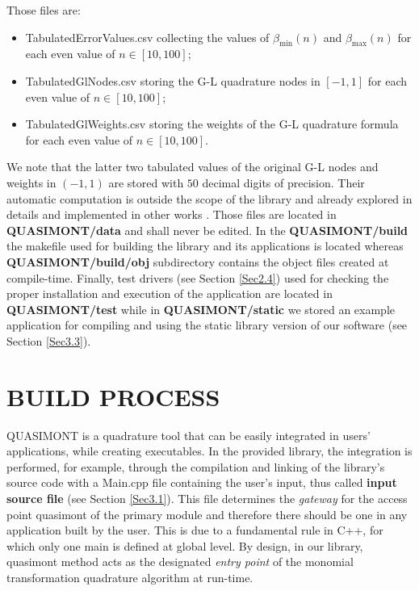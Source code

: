 \documentclass[a4paper, twosided]{book}
\begin{document}
\noindent 
 Those files are:
\begin{itemize}
    \item \colorbox{poliGrayBlue}{TabulatedErrorValues.csv} collecting the values of $\beta_{\text{min}}(n)$ and $\beta_{\text{max}}(n)$ for each even value of $n\in[10,100]$;
    \item \colorbox{poliGrayBlue}{TabulatedGlNodes.csv} storing the G-L quadrature nodes in $[-1,1]$ for each even value of $n\in[10,100]$;
    \item \colorbox{poliGrayBlue}{TabulatedGlWeights.csv} storing the weights of the G-L quadrature formula for each even value of $n\in[10,100]$.
\end{itemize}
We note that the latter two tabulated values of the original G-L nodes and weights in $(-1,1)$ are stored with $50$ decimal digits of precision. Their automatic computation is outside the scope of the library and already explored in details and implemented in other works \cite{Gautschi94,Hale13}. Those files are located in \colorbox{poliGrayBlue}{\textbf{QUASIMONT/data}} and shall never be edited. In the \colorbox{poliGrayBlue}{\textbf{QUASIMONT/build}} the \colorbox{poliGrayBlue}{makefile} used for building the library and its applications is located whereas \colorbox{poliGrayBlue}{\textbf{QUASIMONT/build/obj}} subdirectory contains the object files created at compile-time. Finally, test drivers (see Section \ref{Sec2.4}) used for checking the proper installation and execution of the application are located in \colorbox{poliGrayBlue}{\textbf{QUASIMONT/test}} while in \colorbox{poliGrayBlue}{\textbf{QUASIMONT/static}} we stored an example application for compiling and using the static library version of our software (see Section \ref{Sec3.3}).

\newpage
\section[Build process]{\changefont BUILD PROCESS}\label{Sec2.3}

\noindent
QUASIMONT is a quadrature tool that can be easily integrated in  users' applications, while creating executables. In the provided library, the integration is performed, for example, through the compilation and linking of the library's source code with a \colorbox{poliGrayBlue}{Main.cpp} file containing the user's input, thus called \color{poliDarkBlue} \textbf{input source file} \color{black} (see Section \ref{Sec3.1}). This file determines the {\itshape gateway} for the access point \colorbox{poliGrayBlue}{quasimont} of the primary module and therefore there should be one in any application built by the user. This is due to a fundamental rule in C++, for which only one \colorbox{poliGrayBlue}{main} is defined at global level. By design, in our library, \colorbox{poliGrayBlue}{quasimont} method acts as the designated {\itshape entry point} of the monomial transformation quadrature algorithm at run-time.
\end{document}

